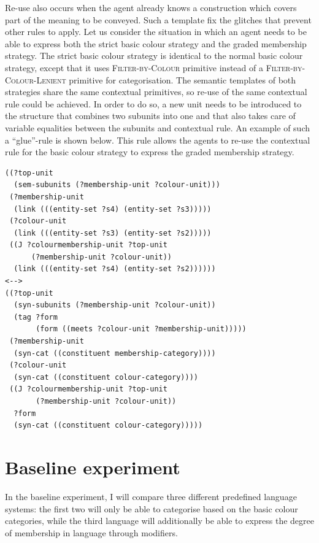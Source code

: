 Re-use also occurs when the agent already knows a construction which
covers part of the meaning to be conveyed. Such a template fix the
glitches that prevent other rules to apply. Let us consider the
situation in which an agent needs to be able to express both the
strict basic colour strategy and the graded membership
  strategy. The strict basic colour strategy is identical to the
normal basic colour strategy, except that it uses
\textsc{Filter-by-Colour} primitive instead of a
\textsc{Filter-by-Colour-Lenient} primitive for categorisation.  The
semantic templates of both strategies share the same contextual
primitives, so re-use of the same contextual rule could be achieved. In
order to do so, a new unit needs to be introduced to the structure
that combines two subunits into one and that also takes care of
variable equalities between the subunits and contextual rule. An
example of such a ``glue''-rule is shown below. This rule allows the
agents to re-use the contextual rule for the basic colour
  strategy to express the graded membership strategy.

\footnotesize
{}
\begin{lstlisting}
((?top-unit 
  (sem-subunits (?membership-unit ?colour-unit)))
 (?membership-unit 
  (link (((entity-set ?s4) (entity-set ?s3)))))
 (?colour-unit 
  (link (((entity-set ?s3) (entity-set ?s2)))))
 ((J ?colourmembership-unit ?top-unit 
      (?membership-unit ?colour-unit))
  (link (((entity-set ?s4) (entity-set ?s2))))))
<-->
((?top-unit
  (syn-subunits (?membership-unit ?colour-unit))
  (tag ?form 
       (form ((meets ?colour-unit ?membership-unit)))))
 (?membership-unit
  (syn-cat ((constituent membership-category))))
 (?colour-unit 
  (syn-cat ((constituent colour-category))))
 ((J ?colourmembership-unit ?top-unit 
       (?membership-unit ?colour-unit))
  ?form
  (syn-cat ((constituent colour-category)))))
\end{lstlisting}
\normalsize


\section{Baseline experiment}
\label{s:gms-baseline-experiment}

In the baseline experiment, I will compare three different predefined language
systems: the first two will only be able to categorise based on the
basic colour categories, while the third language will additionally be
able to express the degree of membership in language through
modifiers.

